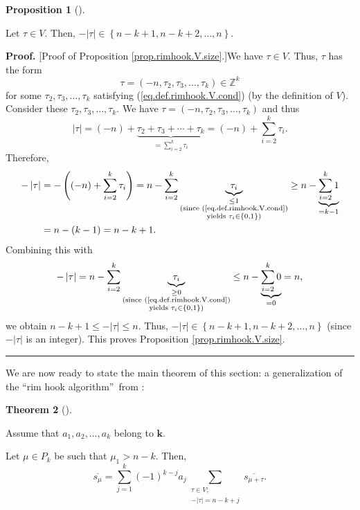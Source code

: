 \documentclass[numbers=enddot,12pt,final,onecolumn,notitlepage]{scrartcl}%
\theoremstyle{definition}
\newtheorem{theo}{Theorem}[section]
\newenvironment{theorem}[1][]
{\begin{theo}[#1]\begin{leftbar}}
{\end{leftbar}\end{theo}}
\newtheorem{prop}[theo]{Proposition}
\newenvironment{proposition}[1][]
{\begin{prop}[#1]\begin{leftbar}}
{\end{leftbar}\end{prop}}
\newenvironment{proof}[1][Proof]{\noindent\textbf{#1.} }{\ \rule{0.5em}{0.5em}}
\let\sumnonlimits\sum
\renewcommand{\sum}{\sumnonlimits\limits}
\begin{document}
\begin{proposition}
\label{prop.rimhook.V.size}Let $\tau\in V$. Then, $-\left\vert \tau\right\vert
\in\left\{  n-k+1,n-k+2,\ldots,n\right\}  $.
\end{proposition}

\begin{proof}
[Proof of Proposition \ref{prop.rimhook.V.size}.]We have $\tau\in V$. Thus,
$\tau$ has the form
\[
\tau=\left(  -n,\tau_{2},\tau_{3},\ldots,\tau_{k}\right)  \in\mathbb{Z}^{k}%
\]
for some $\tau_{2},\tau_{3},\ldots,\tau_{k}$ satisfying
(\ref{eq.def.rimhook.V.cond}) (by the definition of $V$). Consider these
$\tau_{2},\tau_{3},\ldots,\tau_{k}$. We have $\tau=\left(  -n,\tau_{2}%
,\tau_{3},\ldots,\tau_{k}\right)  $ and thus%
\[
\left\vert \tau\right\vert =\left(  -n\right)  +\underbrace{\tau_{2}+\tau
_{3}+\cdots+\tau_{k}}_{=\sum_{i=2}^{k}\tau_{i}}=\left(  -n\right)  +\sum
_{i=2}^{k}\tau_{i}.
\]
Therefore,%
\begin{align*}
-\left\vert \tau\right\vert  &  =-\left(  \left(  -n\right)  +\sum_{i=2}%
^{k}\tau_{i}\right)  =n-\sum_{i=2}^{k}\underbrace{\tau_{i}}_{\substack{\leq
1\\\text{(since (\ref{eq.def.rimhook.V.cond})}\\\text{yields }\tau_{i}%
\in\left\{  0,1\right\}  \text{)}}}\geq n-\underbrace{\sum_{i=2}^{k}1}%
_{=k-1}\\
&  =n-\left(  k-1\right)  =n-k+1.
\end{align*}
Combining this with%
\[
-\left\vert \tau\right\vert =n-\sum_{i=2}^{k}\underbrace{\tau_{i}%
}_{\substack{\geq0\\\text{(since (\ref{eq.def.rimhook.V.cond})}\\\text{yields
}\tau_{i}\in\left\{  0,1\right\}  \text{)}}}\leq n-\underbrace{\sum_{i=2}%
^{k}0}_{=0}=n,
\]
we obtain $n-k+1\leq-\left\vert \tau\right\vert \leq n$. Thus, $-\left\vert
\tau\right\vert \in\left\{  n-k+1,n-k+2,\ldots,n\right\}  $ (since
$-\left\vert \tau\right\vert $ is an integer). This proves Proposition
\ref{prop.rimhook.V.size}.
\end{proof}

We are now ready to state the main theorem of this section: a generalization
of the \textquotedblleft rim hook algorithm\textquotedblright\ from
\cite[\S 2, Main Lemma]{BeCiFu99}:

\begin{theorem}
\label{thm.rimhook}Assume that $a_{1},a_{2},\ldots,a_{k}$ belong to
$\mathbf{k}$.

Let $\mu\in P_{k}$ be such that $\mu_{1}>n-k$. Then,%
\[
\overline{s_{\mu}}=\sum_{j=1}^{k}\left(  -1\right)  ^{k-j}a_{j}\sum
_{\substack{\tau\in V;\\-\left\vert \tau\right\vert =n-k+j}}\overline
{s_{\mu+\tau}}.
\]

\end{theorem}
\end{document}
